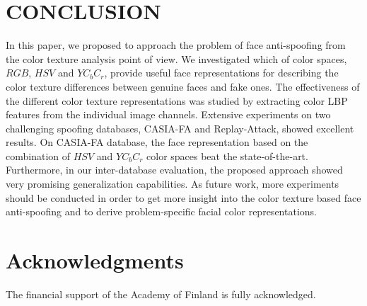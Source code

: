 \documentclass{article}
\begin{document}
\section{CONCLUSION}
	\vspace{-2mm}
\label{sec:conclusion}
In this paper, we proposed to approach the problem of face anti-spoofing from the color texture analysis point of view. We investigated which of color spaces, $RGB$, $HSV$ and $YC_bC_r$, provide useful face representations for describing the color texture differences between genuine faces and fake ones. The effectiveness of the different color texture representations was studied by extracting color LBP features from the individual image channels. Extensive experiments on two challenging spoofing databases, CASIA-FA and Replay-Attack, showed excellent results. On CASIA-FA database, the face representation based on the combination of $HSV$ and $YC_bC_r$ color spaces beat the state-of-the-art. Furthermore, in our inter-database evaluation, the proposed approach showed very promising generalization capabilities. As future work, more experiments should be conducted in order to get more insight into the color texture based face anti-spoofing and to derive problem-specific facial color representations.

\section*{Acknowledgments}
The financial support of the Academy of Finland is fully acknowledged. 



\end{document}
